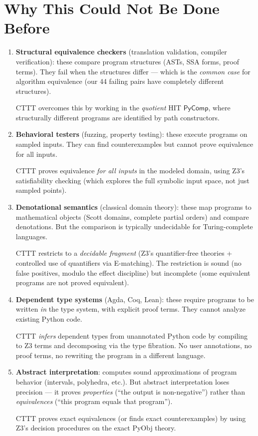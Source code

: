 \documentclass[11pt,a4paper]{report}
\theoremstyle{definition}
\theoremstyle{plain}
\begin{document}
\section{Why This Could Not Be Done Before}

\begin{enumerate}
  \item \textbf{Structural equivalence checkers} (translation
    validation, compiler verification): these compare program
    structures (ASTs, SSA forms, proof terms).  They fail when
    the structures differ --- which is the \emph{common case} for
    algorithm equivalence (our 44 failing pairs have completely
    different structures).

    CTTT overcomes this by working in the \emph{quotient} HIT
    $\mathsf{PyComp}$, where structurally different programs are
    identified by path constructors.

  \item \textbf{Behavioral testers} (fuzzing, property testing):
    these execute programs on sampled inputs.  They can find
    counterexamples but cannot prove equivalence for all inputs.

    CTTT proves equivalence \emph{for all inputs} in the modeled
    domain, using Z3's satisfiability checking (which explores the
    full symbolic input space, not just sampled points).

  \item \textbf{Denotational semantics} (classical domain theory):
    these map programs to mathematical objects (Scott domains,
    complete partial orders) and compare denotations.  But the
    comparison is typically undecidable for Turing-complete languages.

    CTTT restricts to a \emph{decidable fragment} (Z3's quantifier-free
    theories + controlled use of quantifiers via E-matching).  The
    restriction is sound (no false positives, modulo the effect
    discipline) but incomplete (some equivalent programs are not
    proved equivalent).

  \item \textbf{Dependent type systems} (Agda, Coq, Lean): these
    require programs to be written \emph{in} the type system, with
    explicit proof terms.  They cannot analyze existing Python code.

    CTTT \emph{infers} dependent types from unannotated Python code
    by compiling to Z3 terms and decomposing via the type fibration.
    No user annotations, no proof terms, no rewriting the program
    in a different language.

  \item \textbf{Abstract interpretation}: computes sound
    approximations of program behavior (intervals, polyhedra, etc.).
    But abstract interpretation loses precision --- it proves
    \emph{properties} (``the output is non-negative'') rather than
    \emph{equivalences} (``this program equals that program'').

    CTTT proves exact equivalences (or finds exact counterexamples)
    by using Z3's decision procedures on the exact PyObj theory.
\end{enumerate}
\end{document}
